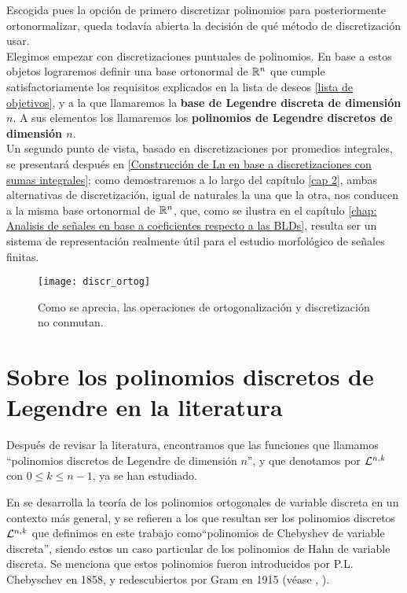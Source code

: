 Escogida pues la opción de primero 
discretizar polinomios para posteriormente
ortonormalizar, queda todavía abierta
la decisión de qué método de discretización usar. \\

Elegimos empezar
con discretizaciones puntuales de polinomios.
En base a estos objetos lograremos definir
una base ortonormal de $\mathbb{R}^{n}$ que cumple satisfactoriamente
los requisitos explicados en la lista de deseos
\ref{lista de objetivos}, y a la que llamaremos
la \textbf{base de Legendre discreta de dimensión $n$}. 
A sus elementos los llamaremos los \textbf{polinomios de Legendre
discretos de dimensión $n$}.\\

Un segundo punto de vista, basado
en discretizaciones por promedios integrales,
se presentará después en
\ref{Construcción de Ln en base a discretizaciones con sumas integrales}; 
como demostraremos a lo largo del capítulo \ref{cap 2}, 
ambas alternativas
de discretización, igual de naturales la una que la otra, nos
conducen a la misma base ortonormal de $\mathbb{R}^{n}$,
que, como se ilustra en el capítulo 
\ref{chap: Analisis de señales en base a coeficientes respecto a las BLDs},
resulta ser un sistema de representación
realmente útil para el estudio morfológico de señales finitas.


\begin{figure}[H]
\centering\captionsetup{format = hang}
	\begin{measuredfigure}
		\label{fig: ortogonalizacion, discretizacion}
		\texttt{[image: discr\_ortog]} 
		\caption{Como se aprecia, las operaciones de
		ortogonalización y discretización no conmutan.}
 	\end{measuredfigure}
 \end{figure}


\section{Sobre los polinomios discretos de Legendre en la literatura}
\label{sec: Sobre los polinomios discretos de Legendre en la literatura}

Después de revisar la literatura, encontramos que
las funciones que llamamos ``polinomios discretos de Legendre
de dimensión $n$'', y que denotamos
por $\mathcal{L}^{n,k}$ con $0 \leq k \leq n-1$, ya se han estudiado.

En \cite{nikiforov} se desarrolla la teoría 
de los polinomios ortogonales de variable discreta
en un contexto
más general, y se refieren a los que resultan ser
los polinomios discretos $\mathcal{L}^{n,k}$ que definimos
en este trabajo
como``polinomios de Chebyshev de variable discreta'', 
siendo estos un caso particular
de los polinomios de Hahn 
de variable discreta.
Se menciona que estos polinomios
fueron introducidos
por P.L. Chebyschev en 1858,
y redescubiertos por
Gram en 1915
(véase \cite{tcheb}, \cite{Neuman}).

